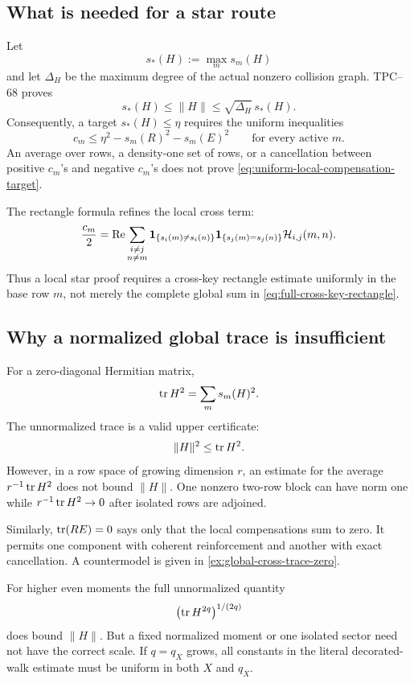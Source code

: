 \subsection{What is needed for a star route}

Let
\[
 s_*(H):=\max_m s_m(H)
\]
and let \(\Delta_H\) be the maximum degree of the actual nonzero collision
graph.  TPC--68 proves
\begin{equation}
 s_*(H)\le\|H\|\le\sqrt{\Delta_H}\,s_*(H).
 \label{eq:star-sandwich}
\end{equation}
Consequently, a target \(s_*(H)\le\eta\) requires the uniform inequalities
\begin{equation}
 c_m
 \le
 \eta^2-s_m(R)^2-s_m(E)^2
 \qquad\text{for every active }m.
 \label{eq:uniform-local-compensation-target}
\end{equation}
An average over rows, a density-one set of rows, or a cancellation between
positive \(c_m\)'s and negative \(c_m\)'s does not prove
\eqref{eq:uniform-local-compensation-target}.

The rectangle formula refines the local cross term:
\begin{equation}
 \frac{c_m}{2}
 =
 \operatorname{Re}
 \sum_{\substack{i\ne j\\n\ne m}}
 \mathbf 1_{\{s_i(m)\ne s_i(n)\}}
 \mathbf 1_{\{s_j(m)=s_j(n)\}}
 \mathcal H_{i,j}(m,n).
 \label{eq:local-cross-key-rectangles}
\end{equation}
Thus a local star proof requires a cross-key rectangle estimate uniformly
in the base row \(m\), not merely the complete global sum in
\eqref{eq:full-cross-key-rectangle}.

\subsection{Why a normalized global trace is insufficient}

For a zero-diagonal Hermitian matrix,
\begin{equation}
 \operatorname{tr} H^2=\sum_m s_m(H)^2.
 \label{eq:trace-two-star-sum}
\end{equation}
The unnormalized trace is a valid upper certificate:
\[
 \|H\|^2\le\operatorname{tr} H^2.
\]
However, in a row space of growing dimension \(r\), an estimate for the
average \(r^{-1}\operatorname{tr} H^2\) does not bound \(\|H\|\).  One nonzero two-row
block can have norm one while \(r^{-1}\operatorname{tr} H^2\to0\) after isolated rows are
adjoined.

Similarly, \(\operatorname{tr}(RE)=0\) says only that the local compensations sum to
zero.  It permits one component with coherent reinforcement and another
with exact cancellation.  A countermodel is given in
\cref{ex:global-cross-trace-zero}.

For higher even moments the full unnormalized quantity
\[
 \bigl(\operatorname{tr} H^{2q}\bigr)^{1/(2q)}
\]
does bound \(\|H\|\).  But a fixed normalized moment or one isolated sector
need not have the correct scale.  If \(q=q_X\) grows, all constants in the
literal decorated-walk estimate must be uniform in both \(X\) and \(q_X\).

